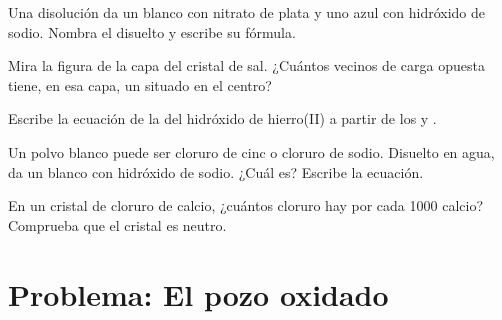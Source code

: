 \begin{exercise}[$\star\star$]\label{exo:g9:ions:8}
Una disolución da un  blanco con nitrato de plata y uno azul
con hidróxido de sodio. Nombra el  disuelto y escribe
su fórmula.
\end{exercise}

\begin{exercise}[$\star\star$]\label{exo:g9:ions:9}
Mira la figura de la capa del cristal de sal. ¿Cuántos vecinos de carga
opuesta tiene, en esa capa, un  situado en el centro?
\end{exercise}

\begin{exercise}[$\star\star$]\label{exo:g9:ions:10}
Escribe la ecuación de la  del hidróxido de hierro(II) a
partir de los   y .
\end{exercise}

\begin{exercise}[$\star\star\star$]\label{exo:g9:ions:11}
Un polvo blanco puede ser cloruro de cinc o cloruro de sodio. Disuelto en
agua, da un  blanco con hidróxido de sodio. ¿Cuál es?
Escribe la ecuación.
\end{exercise}

\begin{exercise}[$\star\star\star$]\label{exo:g9:ions:12}
En un cristal de cloruro de calcio, ¿cuántos  cloruro hay por cada
1000  calcio? Comprueba que el cristal es neutro.
\end{exercise}

\section{Problema: El pozo oxidado}

